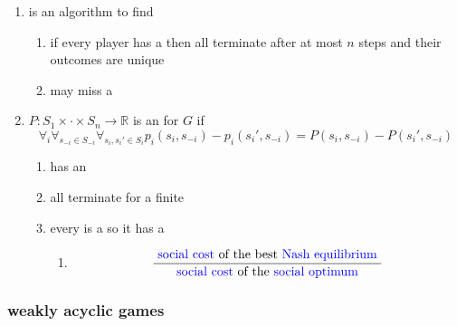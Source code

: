 \begin{enumerate}

  \item
    is an algorithm to find

    \begin{enumerate}
      \item
        if every player has a
        then all
        terminate after at most $n$ steps and their outcomes are unique
      \item
        may miss a
    \end{enumerate}
  \item
    $P: S_1\times \cdot \times S_n \rightarrow \mathbb{R}$ is an
    for $G$ if
    $$
    \forall_i \forall_{s_{-i} \in S_{-i}} \forall_{s_i, s_i' \in S_i}
    p_i(s_i, s_{-i}) -
    p_i(s_i', s_{-i}) =
    P(s_i, s_{-i}) -
    P(s_i', s_{-i})
    $$
    \begin{enumerate}
      \item
        has an

      \item
        all
        terminate for a finite

      \item
        every
        is a
        so it has a

        \begin{enumerate}
          \item
            $$
            \frac{\text{
              {\color{blue}{social cost}}
            of the best
            {\color{blue}{Nash equilibrium}}
          }}{{\text{
            {\color{blue}{social cost}}
            of the
            {\color{blue}{social optimum}}
          }}}
            $$
        \end{enumerate}
    \end{enumerate}

\end{enumerate}

\subsubsection{weakly acyclic games}

